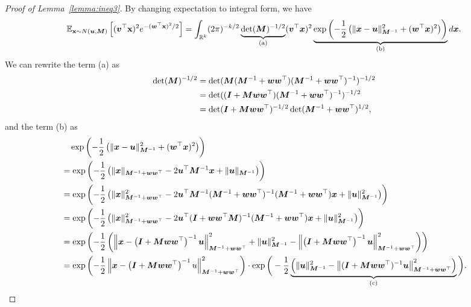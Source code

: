 \begin{proof}[Proof of Lemma~\ref{lemma:ineq3}]
By changing expectation to integral form, we have
\begin{equation*}
\mathbb{E}_{{\mathbf{x}} \sim N({\bm{u}},{\bm{M}})} \left[ ({\bm{v}}^\top {\mathbf{x}})^2 e^{-({\bm{w}}^\top {\mathbf{x}})^2/2}\right]= \int_{\mathbb{R}^k} (2 \pi)^{-k/2} \underbrace{\det({\bm{M}})^{-1/2}}_{\mathrm{(a)}} ({\bm{v}}^\top {\bm{x}})^2 \underbrace{\exp \left(-\frac{1}{2} \left(\lVert {\bm{x}}-{\bm{u}}\rVert_{{\bm{M}}^{-1}}^2 + ({\bm{w}}^\top {\bm{x}})^2 \right)\right)}_{\mathrm{(b)}} d{\bm{x}}.
\end{equation*}
We can rewrite the term (a) as
\begin{align*}
    \det ({\bm{M}})^{-1/2} &= \det({\bm{M}}({\bm{M}}^{-1} +{\bm{w}}{\bm{w}}^\top)({\bm{M}}^{-1} +{\bm{w}}{\bm{w}}^\top)^{-1})^{-1/2}\\
    &= \det (({\bm{I}}+{\bm{M}}{\bm{w}}{\bm{w}}^\top)({\bm{M}}^{-1} +{\bm{w}}{\bm{w}}^\top)^{-1})^{-1/2} \\
    &= \det({\bm{I}}+{\bm{M}}{\bm{w}}{\bm{w}}^\top)^{-1/2} \det ({\bm{M}}^{-1} + {\bm{w}}{\bm{w}}^\top )^{1/2},
\end{align*}
and the term (b) as
\begin{align*}
    &\quad \exp \left(-\frac{1}{2} \left(\lVert \vx-\vu\rVert_{\mM^{-1}}^2 + (\vw^\top \vx)^2 \right)\right)\\
    &= \exp \left(-\frac{1}{2} \left( \lVert \vx \rVert_{\mM^{-1} + \vw\vw^\top} - 2\vu^\top \mM^{-1}\vx + \lVert \vu \rVert_{\mM^{-1}} \right) \right)\\
    &=  \exp \left(-\frac{1}{2} \left( \lVert \vx \rVert_{\mM^{-1} + \vw\vw^\top}^2 - 2\vu^\top \mM^{-1} (\mM^{-1} + \vw\vw^\top)^{-1} (\mM^{-1} + \vw\vw^\top) \vx + \lVert \vu \rVert_{\mM^{-1}}^2 \right) \right)\\
    &= \exp \left(-\frac{1}{2} \left( \lVert \vx \rVert_{\mM^{-1} + \vw\vw^\top}^2 - 2\vu^\top  (\mI + \vw\vw^\top \mM)^{-1} (\mM^{-1} + \vw\vw^\top) \vx + \lVert \vu \rVert_{\mM^{-1}}^2 \right) \right)\\
    &= \exp \left( -\frac{1}{2} \left ( \left \lVert \vx- \left (\mI+\mM\vw\vw^\top \right)^{-1} \vu \right \rVert_{\mM^{-1}+ \vw\vw^\top}^2 
    + \lVert \vu \rVert_{\mM^{-1}}^2 - \left \lVert \left(\mI+\mM\vw\vw^\top \right)^{-1}\vu  \right \rVert_{\mM^{-1} + \vw\vw^\top}^2 \right)\right)\\
    &= \exp \left(-\frac{1}{2} \left \lVert \vx- \left (\mI+\mM\vw\vw^\top \right )^{-1}u \right \rVert_{\mM^{-1} + \vw \vw^\top}^2 \right) \cdot \exp \bigg(-\frac{1}{2}  \underbrace{\left(\lVert \vu \rVert_{\mM^{-1}}^2 - \left \lVert  (\mI+ \mM \vw\vw^\top )^{-1} \vu\right \rVert_{\mM^{-1} + \vw\vw^\top}^2 \right)}_{\mathrm{(c)}}\bigg).

\end{align*}
\end{proof}
